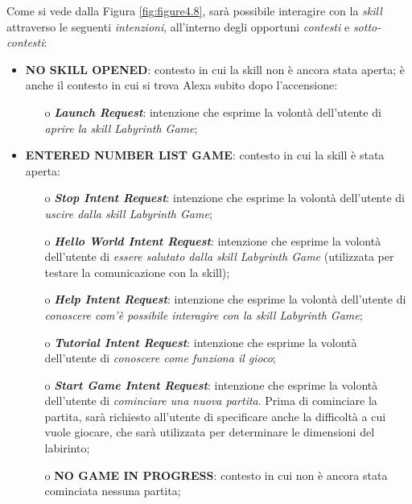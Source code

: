 Come si vede dalla Figura \ref{fig:figure4.8}, sarà possibile interagire con la
\textit{skill} attraverso le seguenti \textit{intenzioni}, all’interno degli
opportuni \textit{contesti} e \textit{sotto-contesti}:
\begin{itemize}
  \item \textbf{NO SKILL OPENED}: contesto in cui la skill non è ancora stata
        aperta; è anche il contesto in cui si trova Alexa subito dopo
        l’accensione:
        \begin{itemize}
          \item[o] \textit{\textbf{Launch Request}}: intenzione che esprime la
                volontà dell’utente di \textit{aprire la skill Labyrinth Game};
        \end{itemize}
  \item \textbf{ENTERED NUMBER LIST GAME}: contesto in cui la skill è stata
        aperta:
        \begin{itemize}
          \item[o] \textit{\textbf{Stop Intent Request}}: intenzione che
                esprime la volontà dell’utente di \textit{uscire dalla skill
                Labyrinth Game};
          \item[o] \textit{\textbf{Hello World Intent Request}}: intenzione che
                esprime la volontà dell’utente di \textit{essere salutato dalla
                skill Labyrinth Game} (utilizzata per testare la comunicazione
                con la skill);
          \item[o] \textit{\textbf{Help Intent Request}}: intenzione che
                esprime la volontà dell’utente di \textit{conoscere com’è
                possibile interagire con la skill Labyrinth Game};
          \item[o] \textit{\textbf{Tutorial Intent Request}}: intenzione che
                esprime la volontà dell’utente di \textit{conoscere come
                funziona il gioco};
          \item[o] \textit{\textbf{Start Game Intent Request}}: intenzione che
                esprime la volontà dell’utente di \textit{cominciare una nuova
                partita}. Prima di cominciare la partita, sarà richiesto
                all’utente di specificare anche la difficoltà a cui vuole
                giocare, che sarà utilizzata per determinare le dimensioni del
                labirinto;
          \item[o] \textbf{NO GAME IN PROGRESS}: contesto in cui non è ancora
                stata cominciata nessuna partita;

\end{itemize}
\end{itemize}
